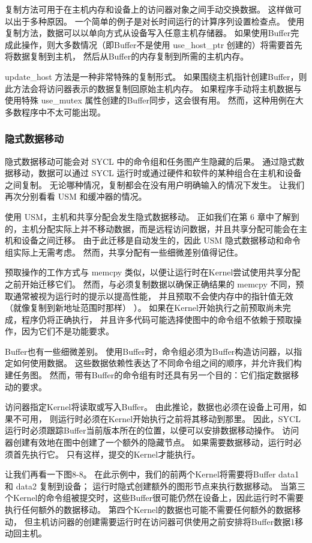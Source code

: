 复制方法可用于在主机内存和设备上的访问器对象之间手动交换数据。 这样做可以出于多种原因。 
一个简单的例子是对长时间运行的计算序列设置检查点。 使用复制方法，数据可以以单向方式从设备写入任意主机存储器。 
如果使用Buffer完成此操作，则大多数情况（即Buffer不是使用 use\_host\_ptr 创建的）将需要首先将数据复制到主机，
然后从Buffer的内存复制到所需的主机内存。

update\_host 方法是一种非常特殊的复制形式。 
如果围绕主机指针创建Buffer，则此方法会将访问器表示的数据复制回原始主机内存。 
如果程序手动将主机数据与使用特殊 use\_mutex 属性创建的Buffer同步，这会很有用。 
然而，这种用例在大多数程序中不太可能出现。

\subsubsection{隐式数据移动}
隐式数据移动可能会对 SYCL 中的命令组和任务图产生隐藏的后果。 
通过隐式数据移动，数据可以通过 SYCL 运行时或通过硬件和软件的某种组合在主机和设备之间复制。 
无论哪种情况，复制都会在没有用户明确输入的情况下发生。 让我们再次分别看看 USM 和缓冲器的情况。

使用 USM，主机和共享分配会发生隐式数据移动。 
正如我们在第 6 章中了解到的，主机分配实际上并不移动数据，而是远程访问数据，并且共享分配可能会在主机和设备之间迁移。 
由于此迁移是自动发生的，因此 USM 隐式数据移动和命令组实际上无需考虑。 
然而，共享分配有一些细微差别值得记住。

预取操作的工作方式与 memcpy 类似，以便让运行时在Kernel尝试使用共享分配之前开始迁移它们。 
然而，与必须复制数据以确保正确结果的 memcpy 不同，预取通常被视为运行时的提示以提高性能，
并且预取不会使内存中的指针值无效（就像复制到新地址范围时那样） ）。 
如果在Kernel开始执行之前预取尚未完成，程序仍将正确执行，
并且许多代码可能选择使图中的命令组不依赖于预取操作，因为它们不是功能要求。

Buffer也有一些细微差别。 使用Buffer时，命令组必须为Buffer构造访问器，以指定如何使用数据。 
这些数据依赖性表达了不同命令组之间的顺序，并允许我们构建任务图。 
然而，带有Buffer的命令组有时还具有另一个目的：它们指定数据移动的要求。

访问器指定Kernel将读取或写入Buffer。 由此推论，数据也必须在设备上可用，如果不可用，
则运行时必须在Kernel开始执行之前将其移动到那里。 
因此，SYCL 运行时必须跟踪Buffer当前版本所在的位置，以便可以安排数据移动操作。 
访问器创建有效地在图中创建了一个额外的隐藏节点。 如果需要数据移动，运行时必须首先执行它。 
只有这样，提交的Kernel才能执行。

让我们再看一下图8-8。 在此示例中，我们的前两个Kernel将需要将Buffer data1 和 data2 复制到设备； 
运行时隐式创建额外的图形节点来执行数据移动。 
当第三个Kernel的命令组被提交时，这些Buffer很可能仍然在设备上，因此运行时不需要执行任何额外的数据移动。 
第四个Kernel的数据也可能不需要任何额外的数据移动，
但主机访问器的创建需要运行时在访问器可供使用之前安排将Buffer数据1移动回主机。

